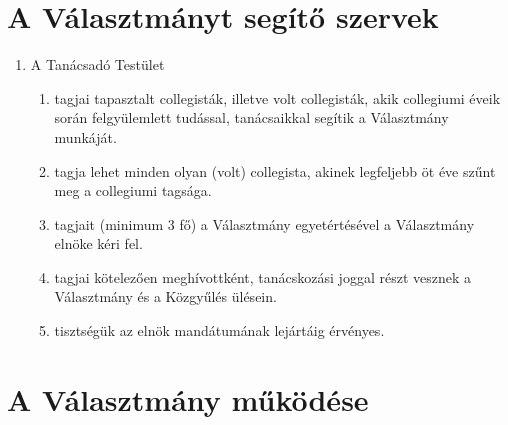 \documentclass{../styles/rulebook}
\begin{document}
\section{A Választmányt segítő szervek}

\begin{enumerate}
	\item A Tanácsadó Testület
	\begin{enumerate}
		\item tagjai tapasztalt collegisták, illetve volt collegisták, akik collegiumi éveik során felgyülemlett tudással, tanácsaikkal segítik a Választmány munkáját.
		\item tagja lehet minden olyan (volt) collegista, akinek legfeljebb öt éve szűnt meg a collegiumi tagsága.
		\item tagjait (minimum 3 fő) a Választmány egyetértésével a Választmány elnöke kéri fel.
		\item tagjai kötelezően meghívottként, tanácskozási joggal részt vesznek a Választmány és a Közgyűlés ülésein.
		\item tisztségük az elnök mandátumának lejártáig érvényes.
	\end{enumerate}
\end{enumerate}

\section{A Választmány működése}
\end{document}
